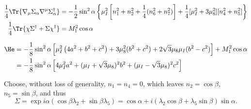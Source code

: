 \documentclass{book}
\begin{document}
%
\begin{align}
    \frac{1}{4} \Tr{\nabla_\mu \Sigma_\alpha \nabla^\mu \Sigma_\alpha^\dagger}
    & = -\frac{1}{2} \sin^2 \alpha
    \left\{
        \mu_I^2 \left[n_1^2 + n_2^2 + \frac{1}{4}(n_6^2 + n_7^2)\right]
        + \frac{1}{4} [\mu_I^2 + 3 \mu_8^2][n_4^2 + n_5^2] 
    \right\} \\
    \frac{1}{4} \Tr{\chi \Sigma^\dagger + \Sigma \chi^\dagger} 
    & = M_1^2 \cos \alpha
\end{align}


\begin{align}
    \He
    &= -\frac{1}{8} \sin^2 \alpha 
    \left[
        \mu_I^2 \left(4a^2 + b^2 + c^2\right) 
        + 3 \mu_8^2 (b^2 + c^2)
        + 2 \sqrt{3} \mu_8 \mu_I (b^2 - c^2)
    \right]
    + M_1^2 \cos\alpha\\
    &= -\frac{1}{8} \sin^2\alpha
    \left[
        4 \mu_I^2 a^2  + (\mu_I + \sqrt 3 \mu_8 )^2b^2 + (\mu_I - \sqrt 3 \mu_8)^2c^2  
    \right]
\end{align}



Choose, without loss of generality, $n_1 = n_4 = 0$, which leaves $n_2 = \cos\beta$, $n_5 = \sin\beta$, and thus
%
\begin{equation}
    \Sigma = \exp{i \alpha (\cos\beta \lambda_2 + \sin\beta \lambda_5) }
    = \cos\alpha + i (\lambda_2 \cos\beta + \lambda_5 \sin\beta)\sin\alpha.
\end{equation}
%
\end{document}
